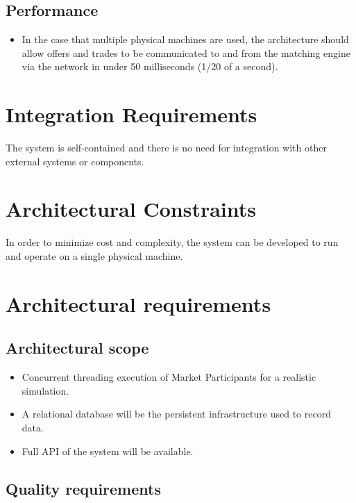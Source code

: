 \documentclass[12pt]{article}
\begin{document}
			\subsection{Performance}
			\begin{itemize}
			\item In the case that multiple physical machines are used, the architecture should allow offers and trades to be communicated to and from the matching engine via the network in under 50 milliseconds (1/20 of a second). 
			\end{itemize}
		\section{Integration Requirements}
		The system is self-contained and there is no need for integration with other external systems or components.
		\section{Architectural Constraints}
		In order to minimize cost and complexity, the system can be developed to run and operate on a single physical machine. 
	
        \newpage
                \section{Architectural requirements}	    
			    \subsection{Architectural scope}	

                                \begin{itemize}
                                     \item Concurrent threading execution of Market Participants for a realistic simulation.
                                     \item A relational database will be the persistent infrastructure used to record data.
                                     \item Full API of the system will be available.
                                 \end{itemize}

			    \subsection{Quality requirements}	
			    		
\end{document}
